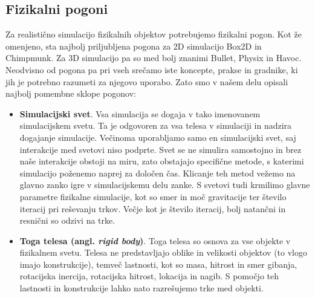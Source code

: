 \documentclass[12pt,a4paper,twoside]{book}
\begin{document}
\subsection{Fizikalni pogoni}
Za realistično simulacijo fizikalnih objektov potrebujemo fizikalni pogon. Kot že omenjeno, sta najbolj priljubljena pogona za 2D simulacijo Box2D in Chimpmunk. Za 3D simulacijo pa so med bolj znanimi Bullet, Physix in Havoc. Neodvisno od pogona pa pri vseh srečamo iste koncepte, prakse in gradnike, ki jih je potrebno razumeti za njegovo uporabo. Zato smo v našem delu opisali najbolj pomembne sklope pogonov:
\begin{itemize}
	\item \textbf{Simulacijski svet}.  Vsa simulacija se dogaja v tako imenovanem simulacijskem svetu. Ta je odgovoren za vsa telesa v simulaciji in nadzira dogajanje simulacije. Večinoma uporabljamo samo en simulacijski svet, saj interakcije med svetovi niso podprte. Svet se ne simulira samostojno in brez naše interakcije obstoji na miru, zato obstajajo specifične metode, s katerimi simulacijo poženemo naprej za določen čas. Klicanje teh metod vežemo na glavno zanko igre v simulacijskemu delu zanke. S svetovi tudi krmilimo glavne parametre fizikalne simulacije, kot so smer in moč gravitacije ter število iteracij pri reševanju trkov. Večje kot je število iteracij, bolj natančni in resnični so odzivi na trke.
	\item \textbf{Toga telesa (angl. \textit{rigid body})}. Toga telesa so osnova za vse objekte v fizikalnem svetu. Telesa ne predstavljajo oblike in velikosti objektov (to vlogo imajo konstrukcije), temveč lastnosti, kot so masa, hitrost  in smer gibanja, rotacijska inercija, rotacijska hitrost, lokacija in nagib. S pomočjo teh lastnosti in konstrukcije lahko nato razrešujemo trke med objekti.
	

\end{itemize}
\end{document}
